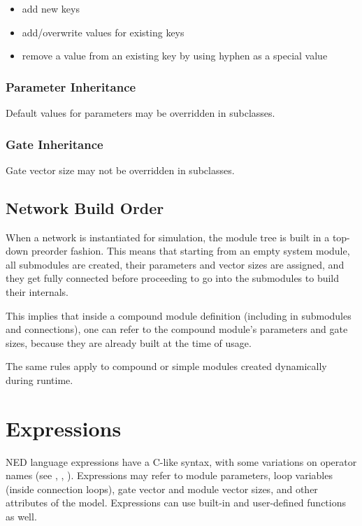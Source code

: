 \begin{itemize}
    \item add new keys
    \item add/overwrite values for existing keys
    \item remove a value from an existing key by using hyphen as a special value
\end{itemize}


\subsubsection{Parameter Inheritance}
\label{sec:ned-ref:parameter-inheritance}

Default values for parameters may be overridden in subclasses.

\subsubsection{Gate Inheritance}
\label{sec:ned-ref:gate-inheritance}

Gate vector size may not be overridden in subclasses.


\subsection{Network Build Order}
\label{sec:ned-ref:build-order}

When a network is instantiated for simulation, the module tree is built in
a top-down preorder fashion. This means that starting from an empty system
module, all submodules are created, their parameters and vector sizes are
assigned, and they get fully connected before proceeding to go into the
submodules to build their internals.

This implies that inside a compound module definition (including in
submodules and connections), one can refer to the compound module's
parameters and gate sizes, because they are already built at the time of
usage.

The same rules apply to compound or simple modules created dynamically during
runtime.


\section{Expressions}
\label{sec:ned-ref:expressions}

NED language expressions have a C-like syntax, with
some variations on operator names (see \ttt{\textasciicircum}, \ttt{\#}, \ttt{\#\#}).
Expressions may refer to module parameters, loop variables (inside connection
 loops), gate vector and module vector sizes, and other attributes
of the model. Expressions can use built-in and user-defined functions as well.


